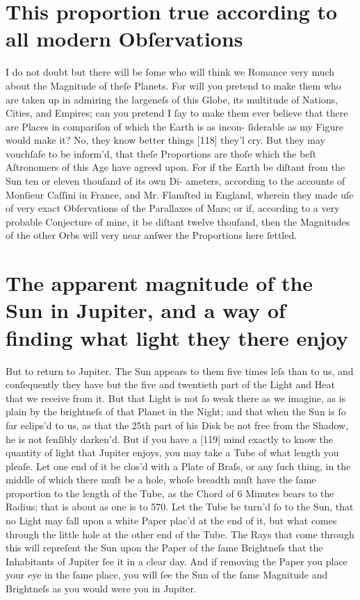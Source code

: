 \documentclass[letterpaper]{book}
\begin{document}
\section{This proportion true according to all modern Obſervations}

I do not doubt but there will be ſome who will think we Romance very
much about the Magnitude of theſe Planets. For will you pretend to make
them who are taken up in admiring the largeneſs of this Globe, its multitude
of Nations, Cities, and Empires; can you pretend I ſay to make them ever
believe that there are Places in compariſon of which the Earth is as incon-
ſiderable as my Figure would make it? No, they know better things [118]
they'l cry. But they may vouchſafe to be inform'd, that theſe Proportions
are thoſe which the beſt Aſtronomers of this Age have agreed upon. For
if the Earth be diſtant from the Sun ten or eleven thouſand of its own Di-
ameters, according to the accounts of Monſieur Caſſini in France, and Mr.
Flamſted in England, wherein they made uſe of very exact Obſervations of
the Parallaxes of Mars; or if, according to a very probable Conjecture of
mine, it be diſtant twelve thouſand, then the Magnitudes of the other Orbs
will very near anſwer the Proportions here ſettled.


\section{The apparent magnitude of the Sun in Jupiter, and a way of finding
what light they there enjoy}

But to return to Jupiter. The Sun appears to them five times leſs than to
us, and conſequently they have but the five and twentieth part of the Light
and Heat that we receive from it. But that Light is not ſo weak there as we
imagine, as is plain by the brightneſs of that Planet in the Night; and that
when the Sun is ſo far eclips'd to us, as that the 25th part of his Disk be
not free from the Shadow, he is not ſenſibly darken'd. But if you have a
[119] mind exactly to know the quantity of light that Jupiter enjoys, you
may take a Tube of what length you pleaſe. Let one end of it be clos'd with a
Plate of Braſs, or any ſuch thing, in the middle of which there muſt be a
hole, whoſe breadth muſt have the ſame proportion to the length of the Tube,
as the Chord of 6 Minutes bears to the Radius; that is about as one is to
570.  Let the Tube be turn'd ſo to the Sun, that no Light may fall upon a
white Paper plac'd at the end of it, but what comes through the little hole
at the other end of the Tube. The Rays that come through this will repreſent
the Sun upon the Paper of the ſame Brightneſs that the Inhabitants of
Jupiter ſee it in a clear day. And if removing the Paper you place your eye
in the ſame place, you will ſee the Sun of the ſame Magnitude and Brightneſs
as you would were you in Jupiter.
\end{document}
